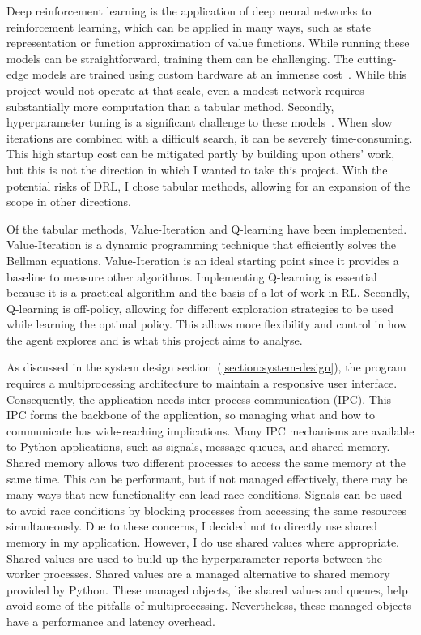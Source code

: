 \documentclass[]{final_report}
\begin{document}
Deep reinforcement learning is the application of deep neural networks to reinforcement learning, which can be applied in many ways, such as state representation or function approximation of value functions. While running these models can be straightforward, training them can be challenging. The cutting-edge models are trained using custom hardware at an immense cost~\cite{DeepRLCost}. While this project would not operate at that scale, even a modest network requires substantially more computation than a tabular method. Secondly, hyperparameter tuning is a significant challenge to these models~\cite{deepRLChallanges}. When slow iterations are combined with a difficult search, it can be severely time-consuming. This high startup cost can be mitigated partly by building upon others' work, but this is not the direction in which I wanted to take this project. With the potential risks of DRL, I chose tabular methods, allowing for an expansion of the scope in other directions.

Of the tabular methods, Value-Iteration and Q-learning have been implemented. Value-Iteration is a dynamic programming technique that efficiently solves the Bellman equations. Value-Iteration is an ideal starting point since it provides a baseline to measure other algorithms. Implementing Q-learning is essential because it is a practical algorithm and the basis of a lot of work in RL. Secondly, Q-learning is off-policy, allowing for different exploration strategies to be used while learning the optimal policy. This allows more flexibility and control in how the agent explores and is what this project aims to analyse.  

As discussed in the system design section~(\ref{section:system-design}), the program requires a multiprocessing architecture to maintain a responsive user interface. Consequently, the application needs inter-process communication (IPC). This IPC forms the backbone of the application, so managing what and how to communicate has wide-reaching implications. Many IPC mechanisms are available to Python applications, such as signals, message queues, and shared memory. Shared memory allows two different processes to access the same memory at the same time. This can be performant, but if not managed effectively, there may be many ways that new functionality can lead race conditions. Signals can be used to avoid race conditions by blocking processes from accessing the same resources simultaneously. Due to these concerns, I decided not to directly use shared memory in my application. However, I do use shared values where appropriate. Shared values are used to build up the hyperparameter reports between the worker processes. Shared values are a managed alternative to shared memory provided by Python. These managed objects, like shared values and queues, help avoid some of the pitfalls of multiprocessing. Nevertheless, these managed objects have a performance and latency overhead. 
\end{document}
